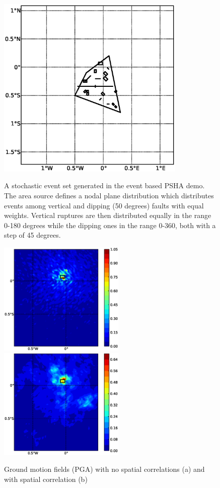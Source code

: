 \begin{figure} 
\centering 
\subcaptionbox{}
{\includegraphics[width=9cm]{./figures/hazard/ses.eps}} 
\caption{A stochastic event set generated in the event based PSHA demo. The area source defines a nodal plane distribution which distributes events among vertical and
dipping (50 degrees) faults with equal weights. Vertical ruptures are then distributed equally in the range 0-180 degrees while the dipping ones in the range 0-360, both
with a step of 45 degrees.}
\label{fig:ses}
\end{figure}

\begin{figure} 
\centering 
\subcaptionbox{}
{\includegraphics[width=6cm]{./figures/hazard/gmf-no-corr.eps}} 
\subcaptionbox{}
{\includegraphics[width=6cm]{./figures/hazard/gmf-corr.eps}} 
\caption{Ground motion fields (PGA) with no spatial correlations (a) and with spatial correlation (b)}
\label{fig:gmfs}
\end{figure}

